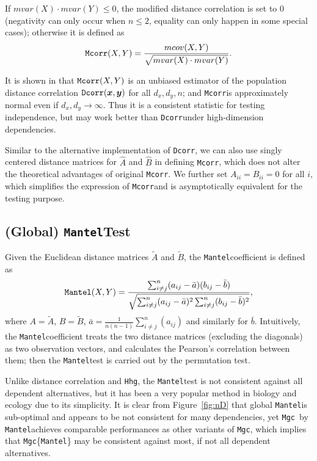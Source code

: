 \documentclass[11pt]{article}
\providecommand{\sct}[1]{{\sc \texttt{#1}}}
\providecommand{\mb}[1]{\boldsymbol{#1}}
\newcommand{\Mgc}{\sct{Mgc}}
\newcommand{\Hhg}{\sct{Hhg}}
\newcommand{\Dcorr}{\sct{Dcorr}}
\newcommand{\Mcorr}{\sct{Mcorr}}
\newcommand{\Mantel}{\sct{Mantel}}
\begin{document}
If $mvar(X) \cdot mvar(Y) \leq 0$, the modified distance correlation is set to $0$ (negativity can only occur when $n\leq 2$, equality can only happen in some special cases); otherwise it is defined as
\begin{equation}
\label{mcorrEqu}
\Mcorr(X,Y)=\frac{mcov(X,Y)}{\sqrt{mvar(X) \cdot mvar(Y)}}.
\end{equation}

It is shown in \cite{SzekelyRizzo2013a} that $\Mcorr(X,Y)$ is an unbiased estimator of the population distance correlation $\Dcorr(\mb{x},\mb{y})$ for all $d_{x}, d_{y}, n$; and \Mcorr is approximately normal even if $d_{x},d_{y} \rightarrow \infty$. Thus it is a consistent statistic for testing independence, but may work better than \Dcorr under high-dimension dependencies. 

Similar to the alternative implementation of \Dcorr, we can also use singly centered distance matrices for $\hat{A}$ and $\hat{B}$ in defining \Mcorr, which does not alter the theoretical advantages of original \Mcorr. We further set $A_{ii}=B_{ii}=0$ for all $i$, which simplifies the expression of \Mcorr and is asymptotically equivalent for the testing purpose. %

\subsection{(Global) \Mantel Test}
\label{appen:mantel}
Given the Euclidean distance matrices $\tilde{A}$ and $\tilde{B}$, the \Mantel coefficient \cite{Mantel1967} is defined as 
\begin{equation}
\Mantel(X,Y)=\frac{\sum_{i \neq j}^{n}(a_{ij}-\bar{a})(b_{ij}-\bar{b})}{\sqrt{\sum_{i \neq j}^{n}(a_{ij}-\bar{a})^2 \sum_{i \neq j}^{n}(b_{ij}-\bar{b})^2}},
\end{equation}
where $A=\tilde{A}$, $B=\tilde{B}$, $\bar{a}=\frac{1}{n(n-1)}\sum_{i \neq j}^{n}(a_{ij})$ and similarly for $\bar{b}$. Intuitively, the \Mantel coefficient treats the two distance matrices (excluding the diagonals) as two observation vectors, and calculates the Pearson's correlation between them; then the \Mantel test is carried out by the permutation test.

Unlike distance correlation and \Hhg, the \Mantel test is not consistent against all dependent alternatives, but it has been a very popular method in biology and ecology due to its simplicity. It is clear from Figure~\ref{fig:nD} that global \Mantel is sub-optimal and appears to be not consistent for many dependencies, yet \Mgc~by \Mantel achieves comparable performances as other variants of \Mgc, which implies that \Mgc\{\Mantel\} may be consistent against most, if not all dependent alternatives.
\end{document}

